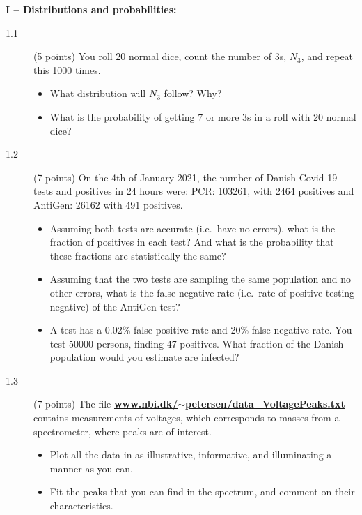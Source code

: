 \documentclass[11pt]{article}
\begin{document}
\vspace{3ex}
\noindent
{\bf I -- Distributions and probabilities:}
\begin{description}
  \item[1.1] (5 points)
  You roll 20 normal dice, count the number of 3s, $N_3$, and repeat this 1000 times.
  \vspace*{-1ex}
  \begin{itemize}
    \item What distribution will $N_3$ follow? Why?
    \item What is the probability of getting 7 or more 3s in a roll with 20 normal dice?
  \end{itemize}
%
\item[1.2] (7 points)
  On the 4th of January 2021, the number of Danish Covid-19 tests and positives in 24 hours were: PCR: 103261, with 2464 positives and
  AntiGen: 26162 with 491 positives.
  \vspace*{-1ex}
  \begin{itemize}
  \item Assuming both tests are accurate (i.e.\ have no errors), what is the fraction of positives in each test? And what is the probability
      that these fractions are statistically the same?
    \item Assuming that the two tests are sampling the same population and no other errors, what is the false negative rate (i.e.\ rate of
      positive testing negative) of the AntiGen test?
    \item 
      A test has a 0.02\% false positive rate and 20\% false negative rate. You test 50000 persons, finding 47 positives.
      What fraction of the Danish population would you estimate are infected?
  \end{itemize}
%
\item[1.3] (7 points) 
  The file \href{http://www.nbi.dk/~petersen/data\_VoltagePeaks.txt}{\bf www.nbi.dk/$\sim$petersen/data\_VoltagePeaks.txt} contains
  measurements of voltages, which corresponds to masses from a spectrometer, where peaks are of interest.
  \vspace*{-1ex}
  \begin{itemize}
    \item Plot all the data in as illustrative, informative, and illuminating a manner as you can.
    \item Fit the peaks that you can find in the spectrum, and comment on their characteristics.
  \end{itemize}
\end{description}
\end{document}
